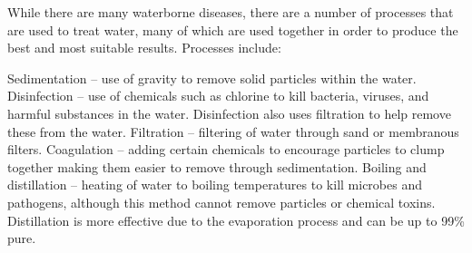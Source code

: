 \documentclass{article}
\begin{document}
While there are many waterborne diseases, there are a number of processes that are used to treat water, many of which are used together in order to produce the best and most suitable results. Processes include:

Sedimentation – use of gravity to remove solid particles within the water.
Disinfection – use of chemicals such as chlorine to kill bacteria, viruses, and harmful substances in the water. Disinfection also uses filtration to help remove these from the water.
Filtration – filtering of water through sand or membranous filters.
Coagulation – adding certain chemicals to encourage particles to clump together making them easier to remove through sedimentation.
Boiling and distillation – heating of water to boiling temperatures to kill microbes and pathogens, although this method cannot remove particles or chemical toxins. Distillation is more effective due to the evaporation process and can be up to 99\% pure.
\end{document}
